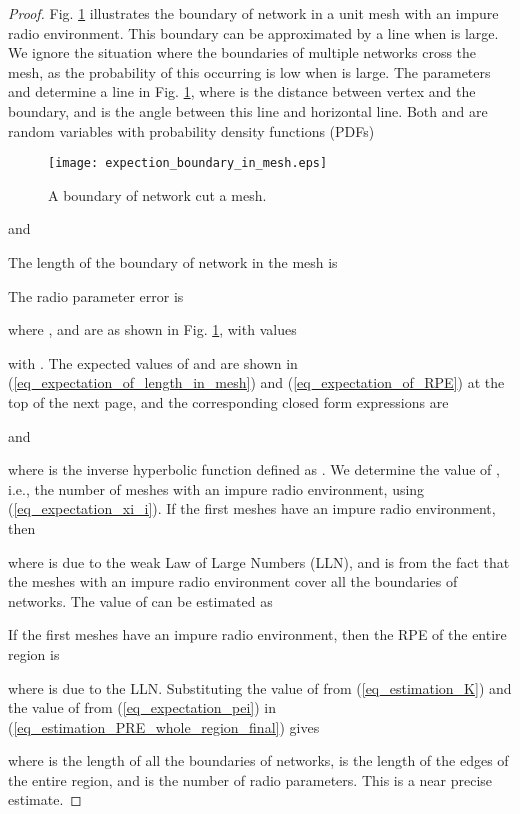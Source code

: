 \documentclass[conference]{IEEEtran}
\begin{document}
\begin{proof}
Fig. \ref{fig_boundary_in_a_mesh} illustrates the boundary of network in a unit mesh  with an impure radio environment.
This boundary can be approximated by a line when  is large.
We ignore the situation where the boundaries of multiple networks cross the mesh, as the probability of this occurring is low when  is large.
The parameters  and  determine a line in Fig. \ref{fig_boundary_in_a_mesh}, where  is the distance between vertex  and the
boundary, and  is the angle between this line and horizontal line.
Both  and  are random variables with probability density functions (PDFs)
\begin{figure}[!t]
\centering
\texttt{[image: expection\_boundary\_in\_mesh.eps]}
\caption{A boundary of network cut a mesh.} \label{fig_boundary_in_a_mesh}
\end{figure}

and

The length of the boundary of network in the mesh is


The radio parameter error is

where ,  and  are as shown in Fig. \ref{fig_boundary_in_a_mesh},
with values


with .
The expected values of  and  are shown in (\ref{eq_expectation_of_length_in_mesh}) and (\ref{eq_expectation_of_RPE})
at the top of the next page, and the corresponding closed form expressions are

and

where  is the inverse hyperbolic function defined as .
We determine the value of , i.e., the number of meshes with an impure radio environment, using (\ref{eq_expectation_xi_i}).
If the first  meshes have an impure radio environment, then

where  is due to the weak Law of Large Numbers (LLN), and  is from the fact that the meshes with an impure radio environment cover all the boundaries of networks.
The value of  can be estimated as


If the first  meshes have an impure radio environment, then the RPE of the entire region is

where  is due to the LLN.
Substituting the value of  from (\ref{eq_estimation_K}) and the value of  from (\ref{eq_expectation_pei})
in (\ref{eq_estimation_PRE_whole_region_final}) gives

where  is the length of all the boundaries of networks,  is the length of the edges of the entire region, and  is the number of radio parameters.
This is a near precise estimate.
\end{proof}
\end{document}
